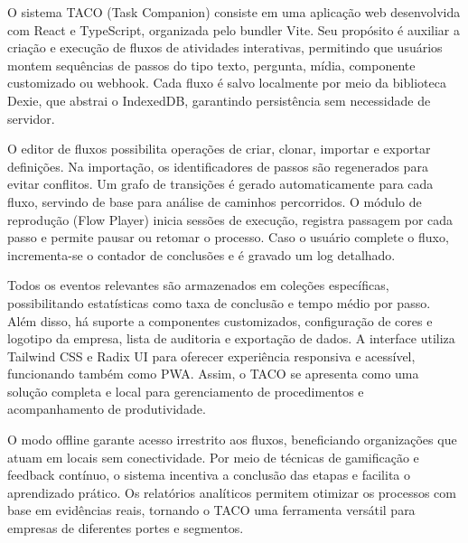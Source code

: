 O sistema TACO (Task Companion) \cite{taco_repo} consiste em uma aplicação web desenvolvida com React e TypeScript, organizada pelo bundler Vite. Seu propósito é auxiliar a criação e execução de fluxos de atividades interativas, permitindo que usuários montem sequências de passos do tipo texto, pergunta, mídia, componente customizado ou webhook. Cada fluxo é salvo localmente por meio da biblioteca Dexie, que abstrai o IndexedDB, garantindo persistência sem necessidade de servidor.

O editor de fluxos possibilita operações de criar, clonar, importar e exportar definições. Na importação, os identificadores de passos são regenerados para evitar conflitos. Um grafo de transições é gerado automaticamente para cada fluxo, servindo de base para análise de caminhos percorridos. O módulo de reprodução (Flow Player) inicia sessões de execução, registra passagem por cada passo e permite pausar ou retomar o processo. Caso o usuário complete o fluxo, incrementa-se o contador de conclusões e é gravado um log detalhado.

Todos os eventos relevantes são armazenados em coleções específicas, possibilitando estatísticas como taxa de conclusão e tempo médio por passo. Além disso, há suporte a componentes customizados, configuração de cores e logotipo da empresa, lista de auditoria e exportação de dados. A interface utiliza Tailwind CSS e Radix UI para oferecer experiência responsiva e acessível, funcionando também como PWA. Assim, o TACO se apresenta como uma solução completa e local para gerenciamento de procedimentos e acompanhamento de produtividade.

O modo offline garante acesso irrestrito aos fluxos, beneficiando organizações que atuam em locais sem conectividade. Por meio de técnicas de gamificação e feedback contínuo, o sistema incentiva a conclusão das etapas e facilita o aprendizado prático. Os relatórios analíticos permitem otimizar os processos com base em evidências reais, tornando o TACO uma ferramenta versátil para empresas de diferentes portes e segmentos.

